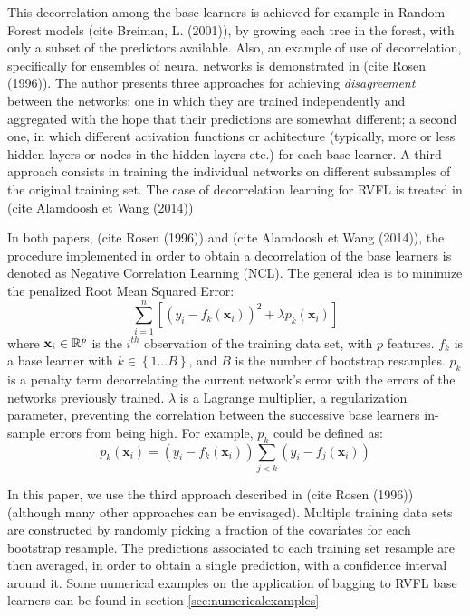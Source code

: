 This decorrelation among the base learners is achieved for example in Random Forest models (cite Breiman, L. (2001)), by growing each tree in the forest, with only a subset of the predictors available. Also, an example of use of decorrelation, specifically for ensembles of neural networks is demonstrated in (cite Rosen (1996)). The author presents three approaches for achieving \textit{disagreement} between the networks: one in which they are trained independently and aggregated with the hope that their predictions are somewhat different; a second one, in which different activation functions or achitecture (typically, more or less hidden layers or nodes in the hidden layers etc.) for each base learner. A third approach consists in training the individual networks on different subsamples of the original training set. The case of decorrelation learning for RVFL is treated in (cite Alamdoosh et Wang (2014))

\medskip

In both papers, (cite Rosen (1996)) and (cite Alamdoosh et Wang (2014)), the procedure implemented in order to obtain a decorrelation of the base learners is denoted as Negative Correlation Learning (NCL). The general idea is to minimize the penalized Root Mean Squared Error:
$$
\sum_{i = 1}^n\left[\left(y_i - f_k(\textbf{x}_i)\right)^2 + \lambda p_k(\textbf{x}_i)\right]
$$
where $\textbf{x}_i \in \mathbb{R}^p$ is the $i^{th}$ observation of the training data set, with $p$ features. $f_k$ is a base learner with $k \in \left \lbrace 1 \ldots B\right \rbrace$, and $B$ is the number of bootstrap resamples. $p_k$ is a penalty term decorrelating the current network's error with the errors of the networks previously trained. $\lambda$ is a Lagrange multiplier, a regularization parameter, preventing the correlation between the successive base learners in-sample errors from being high. For example, $p_k$ could be defined as:
$$
p_k(\textbf{x}_i) = \left(y_i - f_k(\textbf{x}_i)\right)\sum_{j < k}\left(y_i - f_j(\textbf{x}_i)\right)
$$

\medskip

In this paper, we use the third approach described in (cite Rosen (1996))  (although many other approaches can be envisaged). Multiple training data sets are constructed by randomly picking a fraction of the covariates for each bootstrap resample. The predictions associated to each training set resample are then averaged, in order to obtain a single prediction, with a confidence interval around it. Some numerical examples on the application of bagging to RVFL base learners can be found in section \ref{sec:numericalexamples}

